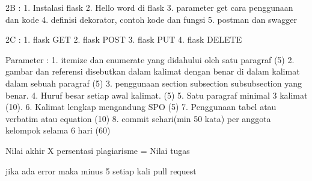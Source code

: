 2B :
1. Instalasi flask
2. Hello word di flask
3. parameter get cara penggunaan dan kode
4. definisi dekorator, contoh kode dan fungsi
5. postman dan swagger

2C :
1. flask GET
2. flask POST
3. flask PUT
4. flask DELETE



Parameter :
1. itemize dan enumerate yang didahului oleh satu paragraf (5)
2. gambar dan referensi disebutkan dalam kalimat dengan benar di dalam kalimat dalam sebuah paragraf (5)
3. penggunaan section subsection subsubsection yang benar. 
4. Huruf besar setiap awal kalimat. (5)
5. Satu paragraf minimal 3 kalimat (10).
6. Kalimat lengkap mengandung SPO (5)
7. Penggunaan tabel atau verbatim atau equation (10)
8. commit sehari(min 50 kata) per anggota kelompok selama 6 hari (60)

Nilai akhir X persentasi plagiarisme = Nilai tugas


jika ada error maka minus 5 setiap kali pull request